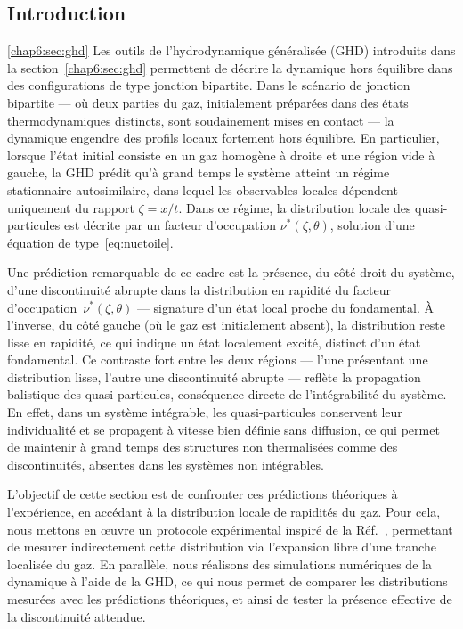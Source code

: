 \subsection*{Introduction}
\ref{chap6:sec:ghd}
Les outils de l'hydrodynamique généralisée (GHD) introduits dans la section~\ref{chap6:sec:ghd} permettent de décrire la dynamique hors équilibre dans des configurations de type jonction bipartite.
Dans le scénario de jonction bipartite — où deux parties du gaz, initialement préparées dans des états thermodynamiques distincts, sont soudainement mises en contact — la dynamique engendre des profils locaux fortement hors équilibre. En particulier, lorsque l’état initial consiste en un gaz homogène à droite et une région vide à gauche, la GHD prédit qu’à grand temps le système atteint un régime stationnaire autosimilaire, dans lequel les observables locales dépendent uniquement du rapport $\zeta = x/t$. Dans ce régime, la distribution locale des quasi-particules est décrite par un facteur d’occupation $\nu^*(\zeta,\theta)$, solution d’une équation de type~\eqref{eq:nuetoile}.

\medskip

Une prédiction remarquable de ce cadre est la présence, du côté droit du système, d’une discontinuité abrupte dans la distribution en rapidité du facteur d’occupation~$\nu^*(\zeta,\theta)$ — signature d’un état local proche du fondamental. À l’inverse, du côté gauche (où le gaz est initialement absent), la distribution reste lisse en rapidité, ce qui indique un état localement excité, distinct d’un état fondamental. Ce contraste fort entre les deux régions — l’une présentant une distribution lisse, l’autre une discontinuité abrupte — reflète la propagation balistique des quasi-particules, conséquence directe de l’intégrabilité du système. En effet, dans un système intégrable, les quasi-particules conservent leur individualité et se propagent à vitesse bien définie sans diffusion, ce qui permet de maintenir à grand temps des structures non thermalisées comme des discontinuités, absentes dans les systèmes non intégrables.

\medskip

L’objectif de cette section est de confronter ces prédictions théoriques à l’expérience, en accédant à la distribution locale de rapidités du gaz. Pour cela, nous mettons en œuvre un protocole expérimental inspiré de la Réf.~\cite{dubois_probing_2024}, permettant de mesurer indirectement cette distribution via l’expansion libre d’une tranche localisée du gaz. En parallèle, nous réalisons des simulations numériques de la dynamique à l’aide de la GHD, ce qui nous permet de comparer les distributions mesurées avec les prédictions théoriques, et ainsi de tester la présence effective de la discontinuité attendue.

